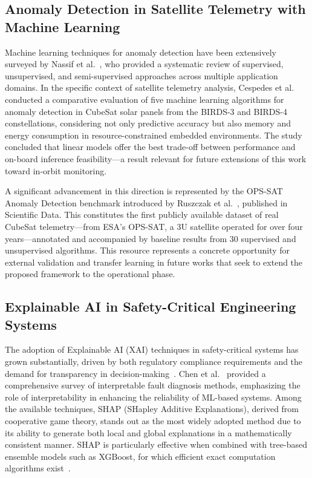 \subsection{Anomaly Detection in Satellite Telemetry with Machine Learning}
\label{subsec:anomaly_detection}

Machine learning techniques for anomaly detection have been extensively surveyed by Nassif et al.~\cite{nassif2021anomaly}, who provided a systematic review of supervised, unsupervised, and semi-supervised approaches across multiple application domains. In the specific context of satellite telemetry analysis, Cespedes et al.~\cite{cespedes2022performance} conducted a comparative evaluation of five machine learning algorithms for anomaly detection in CubeSat solar panels from the BIRDS-3 and BIRDS-4 constellations, considering not only predictive accuracy but also memory and energy consumption in resource-constrained embedded environments. The study concluded that linear models offer the best trade-off between performance and on-board inference feasibility---a result relevant for future extensions of this work toward in-orbit monitoring.

A significant advancement in this direction is represented by the OPS-SAT Anomaly Detection benchmark introduced by Ruszczak et al.~\cite{ruszczak2025opssat}, published in Scientific Data. This constitutes the first publicly available dataset of real CubeSat telemetry---from ESA's OPS-SAT, a 3U satellite operated for over four years---annotated and accompanied by baseline results from 30 supervised and unsupervised algorithms. This resource represents a concrete opportunity for external validation and transfer learning in future works that seek to extend the proposed framework to the operational phase.

\subsection{Explainable AI in Safety-Critical Engineering Systems}
\label{subsec:xai}

The adoption of Explainable AI (XAI) techniques in safety-critical systems has grown substantially, driven by both regulatory compliance requirements and the demand for transparency in decision-making~\cite{adadi2018xai,ortigossa2024xai}. Chen et al.~\cite{chen2024interpretable} provided a comprehensive survey of interpretable fault diagnosis methods, emphasizing the role of interpretability in enhancing the reliability of ML-based systems. Among the available techniques, SHAP (SHapley Additive Explanations), derived from cooperative game theory, stands out as the most widely adopted method due to its ability to generate both local and global explanations in a mathematically consistent manner. SHAP is particularly effective when combined with tree-based ensemble models such as XGBoost, for which efficient exact computation algorithms exist~\cite{xai_xgboost_shap2025}.


